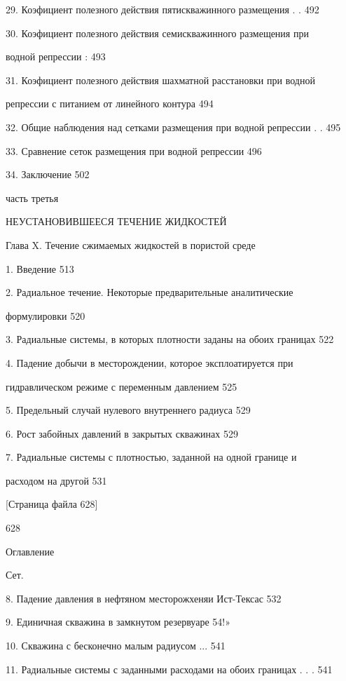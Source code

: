 \documentclass[
  11pt,
]{article}
\begin{document}
29. Коэфициент полезного действия пятискважинного размещения . . 492 \par
30. Коэфициент полезного действия семискважинного размещения при  \par
водной репрессии : 493 \par
31. Коэфициент полезного действия шахматной расстановки при водной  \par
репрессии с питанием от линейного контура 494 \par
32. Общие наблюдения над сетками размещения при водной репрессии . . 495 \par
33. Сравнение сеток размещения при водной репрессии 496 \par
34. Заключение 502 \par
часть третья \par
НЕУСТАНОВИВШЕЕСЯ ТЕЧЕНИЕ ЖИДКОСТЕЙ \par
Глава X. Течение сжимаемых жидкостей в пористой среде \par
1. Введение 513 \par
2. Радиальное течение. Некоторые предварительные аналитические  \par
формулировки 520 \par
3. Радиальные системы, в которых плотности заданы на обоих границах 522 \par
4. Падение добычи в месторождении, которое эксплоатируется при  \par
гидравлическом режиме с переменным давлением 525 \par
5. Предельный случай нулевого внутреннего радиуса 529 \par
6. Рост забойных давлений в закрытых скважинах 529 \par
7. Радиальные системы с плотностью, заданной на одной границе и  \par
расходом на другой 531 \par
\smallskip
\smallskip
\smallskip
{[}Страница файла 628{]}\par
628 \par
Оглавление \par
Сет. \par
8. Падение давления в нефтяном месторожхеняи Ист-Тексас 532 \par
9. Единичная скважина в замкнутом резервуаре 54!» \par
10. Скважина с бесконечно малым радиусом ... 541 \par
11. Радиальные системы с заданными расходами на обоих границах . . . 541 \par
\end{document}
